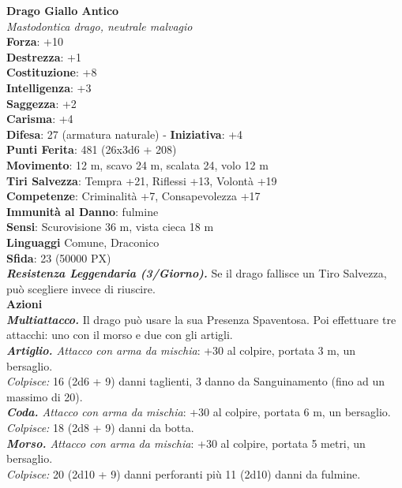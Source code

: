 \begin{multicols}{2}
	\medskip\textbf{Drago Giallo Antico}\\
	\textit{Mastodontica drago, neutrale malvagio}\\
	\textbf{Forza}: +10\\
	\textbf{Destrezza}: +1\\
	\textbf{Costituzione}: +8\\
	\textbf{Intelligenza}: +3\\
	\textbf{Saggezza}: +2\\
	\textbf{Carisma}: +4\\
	\textbf{Difesa}: 27 (armatura naturale) - \textbf{Iniziativa}: +4\\
	\textbf{Punti Ferita}: 481 (26x3d6 + 208)\\
	\textbf{Movimento}: 12 m, scavo 24 m, scalata 24, volo 12 m\\
	\textbf{Tiri Salvezza}: Tempra +21, Riflessi +13, Volontà +19\\
	\textbf{Competenze}: Criminalità +7, Consapevolezza +17\\
	\textbf{Immunità al Danno}: fulmine\\
	\textbf{Sensi}: Scurovisione 36 m, vista cieca 18 m\\
	\textbf{Linguaggi} Comune, Draconico\\
	\textbf{Sfida}: 23 (50000 PX)\smallskip\\
	\textit{\textbf{Resistenza Leggendaria (3/Giorno).}} Se il drago fallisce un Tiro Salvezza, può scegliere invece di riuscire. \\
	\smallskip\textbf{Azioni}\\
	\textit{\textbf{Multiattacco.}} Il drago può usare la sua Presenza Spaventosa. Poi effettuare tre attacchi: uno con il morso e due con gli artigli.\\
	\textit{\textbf{Artiglio.} Attacco con arma da mischia}: +30 al colpire, portata 3 m, un bersaglio.\\
	\textit{Colpisce:} 16 (2d6 + 9) danni taglienti, 3 danno da Sanguinamento (fino ad un massimo di 20).\\
	\textit{\textbf{Coda.} Attacco con arma da mischia}: +30 al colpire, portata 6 m, un bersaglio.\\
	\textit{Colpisce:} 18 (2d8 + 9) danni da botta.\\
	\textit{\textbf{Morso.} Attacco con arma da mischia}: +30 al colpire, portata 5 metri, un bersaglio.\\
	\textit{Colpisce:} 20 (2d10 + 9) danni perforanti più 11 (2d10) danni da fulmine.\\

\end{multicols}
